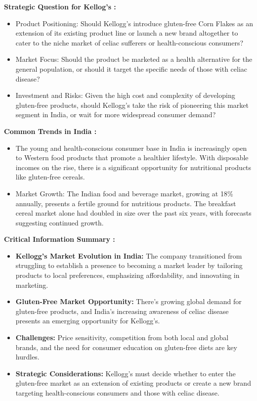 \documentclass[10pt,a4paper]{book}
\begin{document}
\textbf{Strategic Question for Kellog's :} 
\begin{itemize}
    \item Product Positioning: Should Kellogg’s introduce gluten-free Corn Flakes as an extension of its existing product line or launch a new brand altogether to cater to the niche market of celiac sufferers or health-conscious consumers?

    \item Market Focus: Should the product be marketed as a health alternative for the general population, or should it target the specific needs of those with celiac disease?

    \item Investment and Risks: Given the high cost and complexity of developing gluten-free products, should Kellogg’s take the risk of pioneering this market segment in India, or wait for more widespread consumer demand?
\end{itemize}

\textbf{Common Trends in India :}
\begin{itemize}
    \item The young and health-conscious consumer base in India is increasingly open to Western food products that promote a healthier lifestyle. With disposable incomes on the rise, there is a significant opportunity for nutritional products like gluten-free cereals.

    \item Market Growth: The Indian food and beverage market, growing at 18\% annually, presents a fertile ground for nutritious products. The breakfast cereal market alone had doubled in size over the past six years, with forecasts suggesting continued growth.
\end{itemize}

\textbf{Critical Information Summary :} 
\begin{itemize}
    \item \textbf{Kellogg's Market Evolution in India:} The company transitioned from struggling to establish a presence to becoming a market leader by tailoring products to local preferences, emphasizing affordability, and innovating in marketing.

    \item \textbf{Gluten-Free Market Opportunity:} There's growing global demand for gluten-free products, and India’s increasing awareness of celiac disease presents an emerging opportunity for Kellogg’s.

    \item \textbf{Challenges:} Price sensitivity, competition from both local and global brands, and the need for consumer education on gluten-free diets are key hurdles.

    \item \textbf{Strategic Considerations:} Kellogg’s must decide whether to enter the gluten-free market as an extension of existing products or create a new brand targeting health-conscious consumers and those with celiac disease.
\end{itemize}
\end{document}
